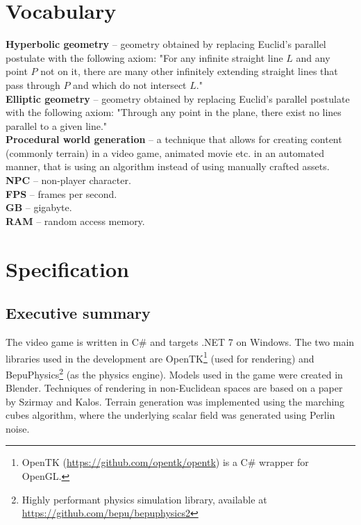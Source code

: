 \documentclass[12pt]{article}
\begin{document}
\section{Vocabulary} %
\textbf{Hyperbolic geometry} -- geometry obtained by replacing Euclid's parallel postulate with the following axiom: "For any infinite straight line $L$ and any point $P$ not on it, there are many other infinitely extending straight lines that pass through $P$ and which do not intersect $L$."\cite{Hyperbolic-Wolfram} \\
\textbf{Elliptic geometry} -- geometry obtained by replacing Euclid's parallel postulate with the following axiom: "Through any point in the plane, there exist no lines parallel to a given line."\cite{Elliptic-Wolfram} \\
\textbf{Procedural world generation} -- a technique that allows for creating content (commonly terrain) in a video game, animated movie etc. in an automated manner, that is using an algorithm instead of using manually crafted assets.\\
\textbf{NPC} -- non-player character.\\
\textbf{FPS} -- frames per second.\\
\textbf{GB} -- gigabyte.\\
\textbf{RAM} -- random access memory.\\


\section{Specification} %

\subsection{Executive summary}

The video game is written in C\# and targets .NET 7 on Windows.
The two main libraries used in the development are OpenTK\footnote{OpenTK (\url{https://github.com/opentk/opentk}) is a C\# wrapper for OpenGL.} (used for rendering)
and BepuPhysics\footnote{Highly performant\cite{BepuPhysics} physics simulation library, available at \url{https://github.com/bepu/bepuphysics2}} (as the physics engine).
Models used in the game were created in Blender.
Techniques of rendering in non-Euclidean spaces are based on a paper by Szirmay and Kalos.
Terrain generation was implemented using the marching cubes algorithm,
where the underlying scalar field was generated using Perlin noise.
\end{document}
